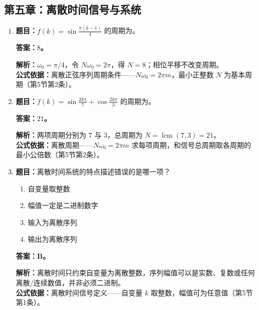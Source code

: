 \documentclass[12pt,a4paper]{ctexart}
\begin{document}
\subsection{第五章：离散时间信号与系统}

\begin{enumerate}[label=\arabic*.]
\item \textbf{题目：}\(\displaystyle f(k)=\sin\frac{\pi(k-1)}4\) 的周期为\underline{\hspace{1.5cm}}。\par
\textbf{答案：$8$。}\par
\textbf{解析：}$\omega_0=\pi/4$，令 $N\omega_0=2\pi$，得 $N=8$；相位平移不改变周期。\\
\textbf{公式依据：}离散正弦序列周期条件——$N\omega_0=2\pi m$，最小正整数 $N$ 为基本周期（第5节第2条）。

\item \textbf{题目：}\(\displaystyle f(k)=\sin\frac{2k\pi}{7}+\cos\frac{2k\pi}{3}\) 的周期为\underline{\hspace{1.5cm}}。\par
\textbf{答案：$21$。}\par
\textbf{解析：}两项周期分别为 $7$ 与 $3$，总周期为 \(\displaystyle N=\operatorname{lcm}(7,3)=21\)。\\
\textbf{公式依据：}离散周期——$N\omega_0=2\pi m$ 求每项周期，和信号总周期取各周期的最小公倍数（第5节第2条）。

\item \textbf{题目：}离散时间系统的特点描述错误的是哪一项？
\begin{enumerate}[label=\Alph*.]
\item 自变量取整数
\item 幅值一定是二进制数字
\item 输入为离散序列
\item 输出为离散序列
\end{enumerate}
\textbf{答案：B。}\par
\textbf{解析：}离散时间只约束自变量为离散整数，序列幅值可以是实数、复数或任何离散/连续数值，并非必须二进制。\\
\textbf{公式依据：}离散时间信号定义——自变量 $k$ 取整数，幅值可为任意值（第5节第1条）。


\end{enumerate}
\end{document}

